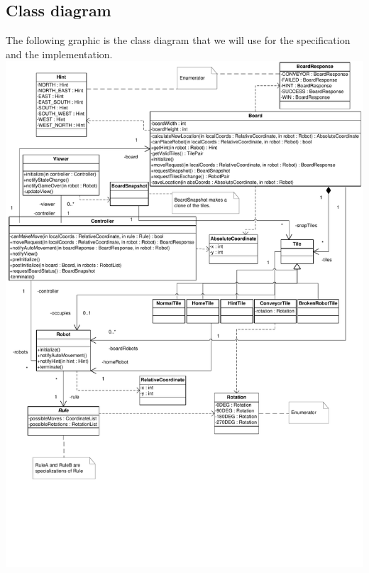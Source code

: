 \subsection{Class diagram}
The following graphic is the class diagram that we will use for the specification and the implementation.
\includegraphics[width=\linewidth]{classdiagram.pdf}

